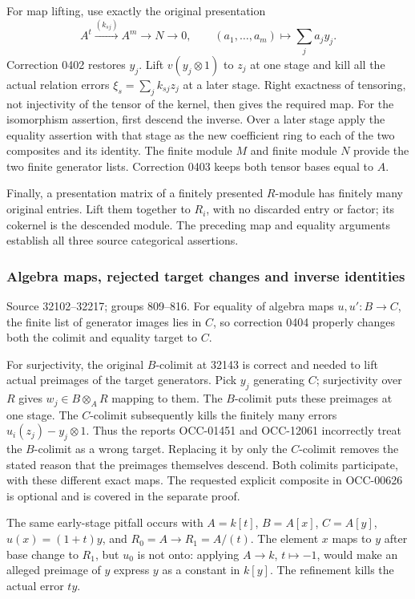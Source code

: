 For map lifting, use exactly the original presentation \[
A^t\xrightarrow{(k_{sj})}A^m\longrightarrow N\longrightarrow0,
\qquad (a_1,\ldots,a_m)\longmapsto\sum_j a_jy_j.
\] Correction 0402 restores \(y_j\). Lift \(v(y_j\otimes1)\) to \(z_j\) at one stage and kill all the actual relation errors \(\xi_s=\sum_jk_{sj}z_j\) at a later stage. Right exactness of tensoring, not injectivity of the tensor of the kernel, then gives the required map. For the isomorphism assertion, first descend the inverse. Over a later stage apply the equality assertion with that stage as the new coefficient ring to each of the two composites and its identity. The finite module \(M\) and finite module \(N\) provide the two finite generator lists. Correction 0403 keeps both tensor bases equal to \(A\).

Finally, a presentation matrix of a finitely presented \(R\)-module has finitely many original entries. Lift them together to \(R_i\), with no discarded entry or factor; its cokernel is the descended module. The preceding map and equality arguments establish all three source categorical assertions.

\subsubsection{Algebra maps, rejected target changes and inverse identities}\label{algebra-proof-036-algebra-maps-rejected-target-changes-and-inverse-identities}

Source 32102--32217; groups 809--816. For equality of algebra maps \(u,u':B\to C\), the finite list of generator images lies in \(C\), so correction 0404 properly changes both the colimit and equality target to \(C\).

For surjectivity, the original \(B\)-colimit at 32143 is correct and needed to lift actual preimages of the target generators. Pick \(y_j\) generating \(C\); surjectivity over \(R\) gives \(w_j\in B\otimes_A R\) mapping to them. The \(B\)-colimit puts these preimages at one stage. The \(C\)-colimit subsequently kills the finitely many errors \(u_i(z_j)-y_j\otimes1\). Thus the reports OCC-01451 and OCC-12061 incorrectly treat the \(B\)-colimit as a wrong target. Replacing it by only the \(C\)-colimit removes the stated reason that the preimages themselves descend. Both colimits participate, with these different exact maps. The requested explicit composite in OCC-00626 is optional and is covered in the separate proof.

The same early-stage pitfall occurs with \(A=k[t]\), \(B=A[x]\), \(C=A[y]\), \(u(x)=(1+t)y\), and \(R_0=A\to R_1=A/(t)\). The element \(x\) maps to \(y\) after base change to \(R_1\), but \(u_0\) is not onto: applying \(A\to k\), \(t\mapsto-1\), would make an alleged preimage of \(y\) express \(y\) as a constant in \(k[y]\). The refinement kills the actual error \(ty\).

